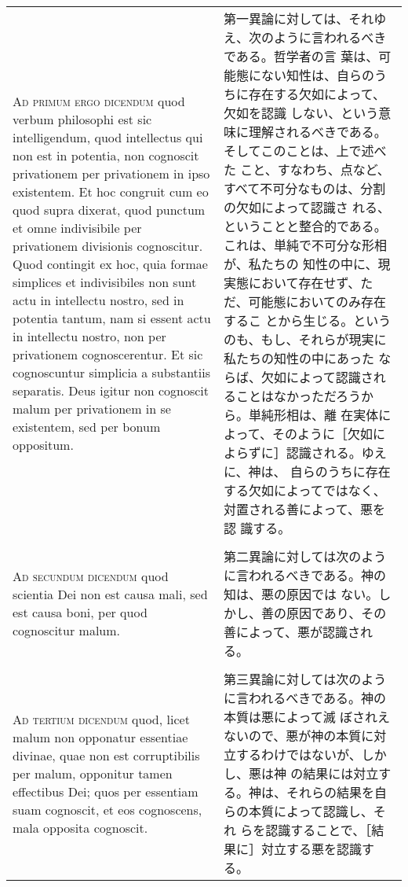 \documentclass[10pt]{jsarticle} %
\begin{document}
\begin{longtable}{p{21em}p{21em}}
\\


{\scshape Ad primum ergo dicendum} quod verbum philosophi est sic
intelligendum, quod intellectus qui non est in potentia, non cognoscit
privationem per privationem in ipso existentem. Et hoc congruit cum eo
quod supra dixerat, quod punctum et omne indivisibile per privationem
divisionis cognoscitur. Quod contingit ex hoc, quia formae simplices
et indivisibiles non sunt actu in intellectu nostro, sed in potentia
tantum, nam si essent actu in intellectu nostro, non per privationem
cognoscerentur. Et sic cognoscuntur simplicia a substantiis
separatis. Deus igitur non cognoscit malum per privationem in se
existentem, sed per bonum oppositum.

&

第一異論に対しては、それゆえ、次のように言われるべきである。哲学者の言
葉は、可能態にない知性は、自らのうちに存在する欠如によって、欠如を認識
しない、という意味に理解されるべきである。そしてこのことは、上で述べた
こと、すなわち、点など、すべて不可分なものは、分割の欠如によって認識さ
れる、ということと整合的である。これは、単純で不可分な形相が、私たちの
知性の中に、現実態において存在せず、ただ、可能態においてのみ存在するこ
とから生じる。というのも、もし、それらが現実に私たちの知性の中にあった
ならば、欠如によって認識されることはなかっただろうから。単純形相は、離
在実体によって、そのように［欠如によらずに］認識される。ゆえに、神は、
自らのうちに存在する欠如によってではなく、対置される善によって、悪を認
識する。

 \\
 \\


{\scshape Ad secundum dicendum} quod scientia Dei non est causa mali,
sed est causa boni, per quod cognoscitur malum.

&

第二異論に対しては次のように言われるべきである。神の知は、悪の原因では
ない。しかし、善の原因であり、その善によって、悪が認識される。

 \\
 \\


{\scshape Ad tertium dicendum} quod, licet malum non opponatur
essentiae divinae, quae non est corruptibilis per malum, opponitur
tamen effectibus Dei; quos per essentiam suam cognoscit, et eos
cognoscens, mala opposita cognoscit.

&

第三異論に対しては次のように言われるべきである。神の本質は悪によって滅
ぼされえないので、悪が神の本質に対立するわけではないが、しかし、悪は神
の結果には対立する。神は、それらの結果を自らの本質によって認識し、それ
らを認識することで、［結果に］対立する悪を認識する。


\end{longtable}
\end{document}

